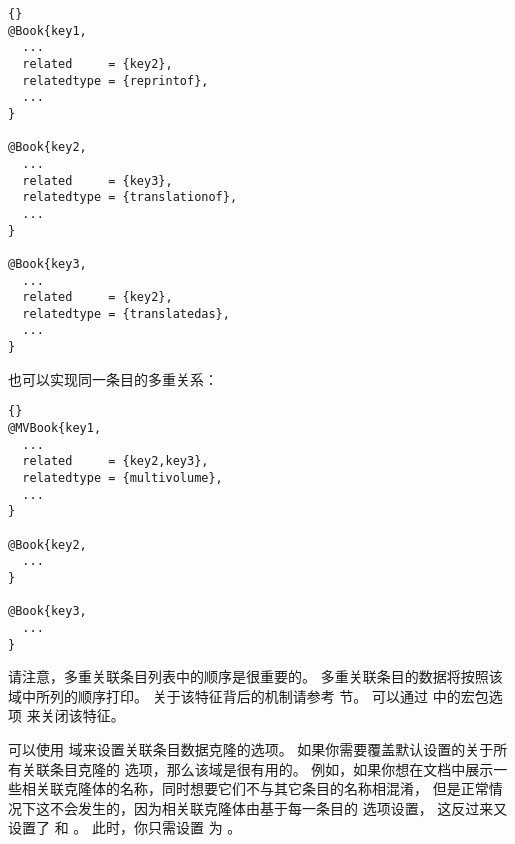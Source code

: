 \begin{lstlisting}[style=bibtex]{}
@Book{key1,
  ...
  related     = {key2},
  relatedtype = {reprintof},
  ...
}

@Book{key2,
  ...
  related     = {key3},
  relatedtype = {translationof},
  ...
}

@Book{key3,
  ...
  related     = {key2},
  relatedtype = {translatedas},
  ...
}
\end{lstlisting}
%
也可以实现同一条目的多重关系：
\begin{lstlisting}[style=bibtex]{}
@MVBook{key1,
  ...
  related     = {key2,key3},
  relatedtype = {multivolume},
  ...
}

@Book{key2,
  ...
}

@Book{key3,
  ...
}
\end{lstlisting}
%
请注意，多重关联条目列表中的顺序是很重要的。
多重关联条目的数据将按照该域中所列的顺序打印。
关于该特征背后的机制请参考  节。
可以通过  中的宏包选项  来关闭该特征。


可以使用  域来设置关联条目数据克隆的选项。
如果你需要覆盖默认设置的关于所有关联条目克隆的  选项，那么该域是很有用的。
例如，如果你想在文档中展示一些相关联克隆体的名称，同时想要它们不与其它条目的名称相混淆，
但是正常情况下这不会发生的，因为相关联克隆体由基于每一条目的  选项设置，
这反过来又设置了  和 。
此时，你只需设置  为 。

